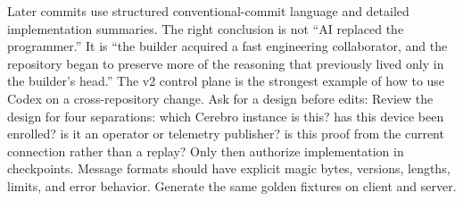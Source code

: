 Later commits use structured conventional-commit language and detailed\markdownRendererSoftLineBreak
{}implementation summaries.\markdownRendererOlItemEnd 
\markdownRendererOlEnd \markdownRendererInterblockSeparator
{}The right conclusion is not “AI replaced the programmer.” It is “the builder\markdownRendererSoftLineBreak
{}acquired a fast engineering collaborator, and the repository began to preserve\markdownRendererSoftLineBreak
{}more of the reasoning that previously lived only in the builder's head.”\markdownRendererInterblockSeparator
{}\markdownRendererThematicBreak{}\markdownRendererInterblockSeparator
{}
\markdownRendererSectionEnd 
\markdownRendererSectionEnd \markdownRendererSectionBegin
{}\markdownRendererInterblockSeparator
{}The v2 control plane is the strongest example of how to use Codex on a\markdownRendererSoftLineBreak
{}cross-repository change.\markdownRendererInterblockSeparator
{}\markdownRendererSectionBegin
{}\markdownRendererInterblockSeparator
{}Ask for a design before edits:\markdownRendererInterblockSeparator
{}\markdownRendererInterblockSeparator
{}Review the design for four separations:\markdownRendererInterblockSeparator
{}\markdownRendererUlBegin
\markdownRendererUlItem {} which Cerebro instance is this?\markdownRendererUlItemEnd 
\markdownRendererUlItem {} has this device been enrolled?\markdownRendererUlItemEnd 
\markdownRendererUlItem {} is it an operator or telemetry publisher?\markdownRendererUlItemEnd 
\markdownRendererUlItem {} is this proof from the current connection rather than a replay?\markdownRendererUlItemEnd 
\markdownRendererUlEnd \markdownRendererInterblockSeparator
{}Only then authorize implementation in checkpoints.\markdownRendererInterblockSeparator
{}
\markdownRendererSectionEnd \markdownRendererSectionBegin
{}\markdownRendererInterblockSeparator
{}Message formats should have explicit magic bytes, versions, lengths, limits,\markdownRendererSoftLineBreak
{}and error behavior. Generate the same golden fixtures on client and server.\markdownRendererSoftLineBreak
